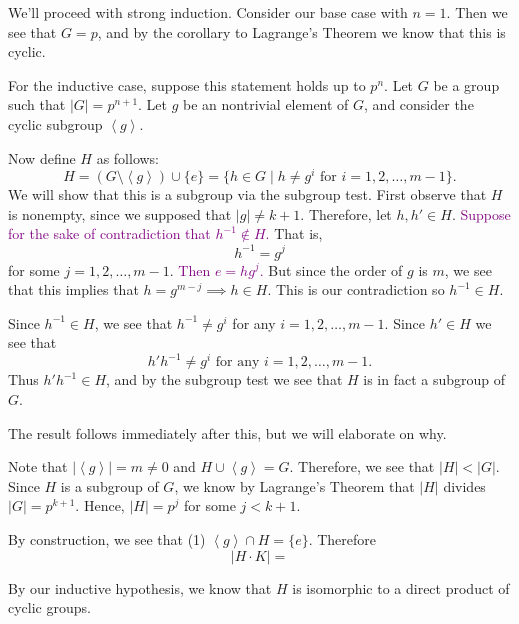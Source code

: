     \begin{prf}
        \textcolor{NavyBlue}{We'll proceed with strong induction.}
        Consider our base case with $n = 1$. Then we see that $G = p$,
        and by the corollary to Lagrange's Theorem we know that this is
        cyclic. 

        For the inductive case, suppose this statement holds up to
        $p^n$. Let $G$ be a group such that $|G| = p^{n+1}$. Let $g$
        be an nontrivial element of $G$, and consider the cyclic
        subgroup $\left< g \right>$.
        
        


    
        Now define $H$ as follows:
        \[
            H = (G\setminus\left< g\right>) \cup \{e\} = \{h \in G \mid h \ne g^i \text{ for } i = 1, 2, \dots, m-1\}.  
        \]
        We will show that this is a subgroup via the subgroup test. 
        First
        observe that $H$ is nonempty, since we supposed that $|g| \ne
        k+1$. Therefore, let $h, h' \in H$. \textcolor{purple}{Suppose
        for the sake of contradiction that $h^{-1} \not\in H$.} That
        is, 
        \[
            h^{-1} = g^{j} 
        \]
        for some $j = 1, 2, \dots, m-1$. \textcolor{purple}{Then
        $e  = hg^{j}$.} But since the order of $g$ is $m$, we see that
        this implies that $h = g^{m - j} \implies h \in H$. This is
        our contradiction so $h^{-1} \in H$. 
        
        Since $h^{-1} \in H$, we see that $h^{-1} \ne g^i$ for any $i
        = 1, 2, \dots, m-1$. Since $h' \in H$ we see that 
        \[
            h'h^{-1} \ne g^{i} \text{ for any } i = 1, 2, \dots, m-1.
        \]
        Thus $h'h^{-1} \in H$, and by the subgroup test we see that
        $H$ is in fact a subgroup of $G$. 

        \textcolor{NavyBlue}{The result follows immediately after this, but we will elaborate on why. }
        
        Note that $|\left< g\right>| = m \ne 0$ and $H \cup \left<g \right>
        = G$. Therefore, we see that $|H| < |G|$. Since $H$ is a
        subgroup of $G$, we know by Lagrange's Theorem that $|H|$
        divides $|G| = p^{k+1}$. Hence, $|H| = p^j$ for some $j <
        k+1$.
        
        By construction, we see that (1) $\left< g \right> \cap H =
        \{e\}$. Therefore 
        \[
            |H \cdot K| =   
        \]

        By our inductive hypothesis, we know that $H$ is isomorphic to
        a direct product of cyclic groups. 

    \end{prf}

